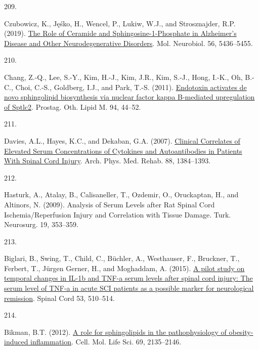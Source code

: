 \documentclass[
]{article}
\newlength{\cslhangindent}
\newlength{\csllabelwidth}
\newlength{\cslentryspacingunit} %
\newenvironment{CSLReferences}[2] %
 {%
  \setlength{\parindent}{0pt}
  \ifodd #1
  \let\oldpar\par
  \def\par{\hangindent=\cslhangindent\oldpar}
  \fi
  \setlength{\parskip}{#2\cslentryspacingunit}
 }%
 {}
\newcommand{\CSLLeftMargin}[1]{\parbox[t]{\csllabelwidth}{#1}}
\newcommand{\CSLRightInline}[1]{\parbox[t]{\linewidth - \csllabelwidth}{#1}\break}
\begin{document}
\begin{CSLReferences}{0}{0}
\leavevmode{}%
\CSLLeftMargin{209. }
\CSLRightInline{Czubowicz, K., Jęśko, H., Wencel, P., Lukiw, W.J., and Strosznajder, R.P. (2019). \href{https://doi.org/10.1007/s12035-018-1448-3}{The {Role} of {Ceramide} and {Sphingosine-1-Phosphate} in {Alzheimer}'s {Disease} and {Other Neurodegenerative Disorders}}. Mol. Neurobiol. 56, 5436--5455.}

\leavevmode{}%
\CSLLeftMargin{210. }
\CSLRightInline{Chang, Z.-Q., Lee, S.-Y., Kim, H.-J., Kim, J.R., Kim, S.-J., Hong, I.-K., Oh, B.-C., Choi, C.-S., Goldberg, I.J., and Park, T.-S. (2011). \href{https://doi.org/10.1016/j.prostaglandins.2010.12.003}{Endotoxin activates de novo sphingolipid biosynthesis via nuclear factor kappa {B-mediated} upregulation of {Sptlc2}}. Prostag. Oth. Lipid M. 94, 44--52.}

\leavevmode{}%
\CSLLeftMargin{211. }
\CSLRightInline{Davies, A.L., Hayes, K.C., and Dekaban, G.A. (2007). \href{https://doi.org/10.1016/j.apmr.2007.08.004}{Clinical {Correlates} of {Elevated Serum Concentrations} of {Cytokines} and {Autoantibodies} in {Patients With Spinal Cord Injury}}. Arch. Phys. Med. Rehab. 88, 1384--1393.}

\leavevmode{}%
\CSLLeftMargin{212. }
\CSLRightInline{Hasturk, A., Atalay, B., Calisaneller, T., Ozdemir, O., Oruckaptan, H., and Altinors, N. (2009). Analysis of {Serum Levels} after {Rat Spinal Cord Ischemia}/{Reperfusion Injury} and {Correlation} with {Tissue Damage}. Turk. Neurosurg. 19, 353--359.}

\leavevmode{}%
\CSLLeftMargin{213. }
\CSLRightInline{Biglari, B., Swing, T., Child, C., Büchler, A., Westhauser, F., Bruckner, T., Ferbert, T., Jürgen Gerner, H., and Moghaddam, A. (2015). \href{https://doi.org/10.1038/sc.2015.28}{A pilot study on temporal changes in {IL-1b} and {TNF-a} serum levels after spinal cord injury: The serum level of {TNF-a} in acute {SCI} patients as a possible marker for neurological remission}. Spinal Cord 53, 510--514.}

\leavevmode{}%
\CSLLeftMargin{214. }
\CSLRightInline{Bikman, B.T. (2012). \href{https://doi.org/10.1007/s00018-012-0917-5}{A role for sphingolipids in the pathophysiology of obesity-induced inflammation}. Cell. Mol. Life Sci. 69, 2135--2146.}


\end{CSLReferences}
\end{document}
